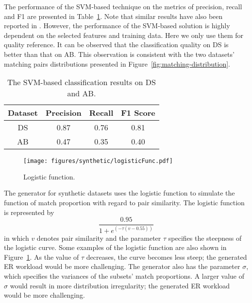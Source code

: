    The performance of the SVM-based technique on the metrics of precision, recall and F1 are presented in Table~\ref{tab:svm-results}. Note that similar results have also been reported in \cite{kopcke2010evaluation}. However, the performance of the SVM-based solution is highly dependent on the selected features and training data. Here we only use them for quality reference. It can be observed that the classification quality on DS is better than that on AB. This observation is consistent with the two datasets' matching pairs distributions presented in Figure~\ref{fig:matching-distribution}.

    \begin{table}
    \caption{The SVM-based classification results on DS and AB.}
    \vspace{-0.1cm}
    \centering
    \label{tab:svm-results}
    \begin{tabular}{|c|c|c|c|}
    \hline
    Dataset & Precision & Recall & F1 Score \\
    \hline
    DS & 0.87 & 0.76 & 0.81 \\
    \hline
    AB & 0.47 & 0.35 & 0.40 \\
    \hline
    \end{tabular}
    \vspace{-0.1cm}
    \end{table}


\begin{figure}
\setlength{\abovecaptionskip}{\figcaptionspace}
\centering
{\texttt{[image: figures/synthetic/logisticFunc.pdf]}}
\caption{Logistic function.}
\label{fig:logistic-func}
\vspace{-0.65cm}
\end{figure}

  The generator for synthetic datasets uses the logistic function to simulate the function of match proportion with regard to pair similarity. The logistic function is represented by
\begin{equation}
  \frac{0.95}{1+e^{(-\tau(v-0.55))}}
\end{equation}
in which $v$ denotes pair similarity and the parameter $\tau$ specifies the steepness of the logistic curve. Some examples of the logistic function are also shown in Figure~\ref{fig:logistic-func}. As the value of $\tau$ decreases, the curve becomes less steep; the generated ER workload would be more challenging. The generator also has the parameter $\sigma$, which specifies the variances of the subsets' match proportions. A larger value of $\sigma$ would result in more distribution irregularity; the generated ER workload would be more challenging.

